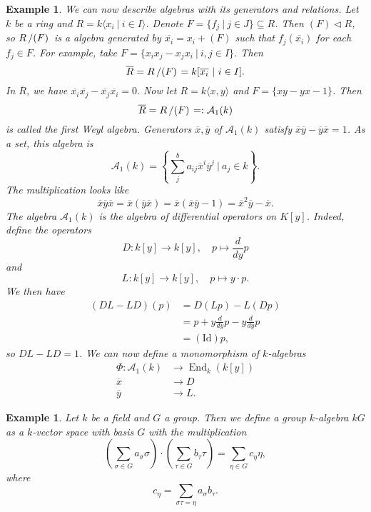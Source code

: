 \documentclass[10pt, a4paper]{article}
\newtheorem{example}[thm]{Example}
\newcommand{\quot}[2]{{\raisebox{0em}{$#1$}\left/\raisebox{0em}{$#2$}\right.}}
\DeclareMathOperator{\en}{End}
\begin{document}
\begin{example}
        We can now describe algebras with its generators and relations.
        Let $k$ be a ring and $R = k \langle x_i\ |\ i \in I\rangle$. Denote $F = \{f_j\ |\ j \in J\} \subseteq R$.
        Then $(F) \lhd R$, so $\quot{R}{(F)}$ is a algebra generated by $\overline{x_i} = x_i + (F)$ such that $f_j (\overline{x_i})$ for each $f_j \in F$.
        For example, take $F = \{x_i x_j - x_j x_i\ |\ i, j \in I\}$. Then 
        $$\overline{R} = \quot{R}{(F)} = k[\overline{x_i}\ |\ i \in I].$$
        In $\overline{R}$, we have $\overline{x_i} \overline{x_j} - \overline{x_j} \overline{x_i} = 0.$
        Now let $R = k\langle x, y\rangle$ and $F = \{xy - yx - 1\}$.
        Then $$\overline{R} = \quot{R}{(F)} =: \mathcal{A}_1 (k)$$ is called the first Weyl algebra.
        Generators $\overline{x}, \overline{y}$ of $\mathcal{A}_1 (k)$ satisfy $\overline{x} \overline{y} - \overline{y} \overline{x} = 1$.
        As a set, this algebra is 
        $$\mathcal{A}_1 (k) = \left\lbrace \sum_j ^{b} a_{ij} \overline{x}^i \overline{y}^j\ |\ a_j \in k \right\rbrace.$$ 
        The multiplication looks like 
        $$\overline{x} \overline{y} \overline{x} = \overline{x} (\overline{y} \overline{x}) = \overline{x} (\overline{x} \overline{y} - 1) = \overline{x}^2 \overline{y} - \overline{x}.$$
        The algebra $\mathcal{A}_1 (k)$ is the algebra of differential operators on $K[y]$. Indeed, define the operators 
        $$D: k[y] \to k[y],\quad p \mapsto \frac{d}{dy} p$$ 
        and $$L: k[y] \to k[y],\quad p \mapsto y \cdot p.$$
        We then have 
        \begin{align*}
            (DL - LD) (p) &= D(Lp) - L(Dp)\\
            &= p + y \frac{d}{dy} p - y \frac{d}{dy} p\\
            &= (\mathrm{Id}) p,
        \end{align*}
        so $DL - LD = 1$. We can now define a monomorphism of $k$-algebras 
        \begin{align*}
            \Phi: \mathcal{A}_1 (k) &\to \en_k (k[y])\\
            \overline{x} &\to D\\
            \overline{y} &\to L.
        \end{align*}    
\end{example}

\begin{example}
        Let $k$ be a field and $G$ a group. Then we define a group $k$-algebra $kG$ as a $k$-vector space with basis $G$ with the multiplication 
        $$\left(\sum_{\sigma \in G} a_{\sigma} \sigma\right) \cdot (\sum_{\tau \in G} b_{\tau} \tau) = \sum_{\eta \in G} c_\eta \eta,$$
        where $$c_\eta = \sum_{\sigma \tau = \eta} a_{\sigma} b_\tau.$$    
\end{example}
\end{document}

